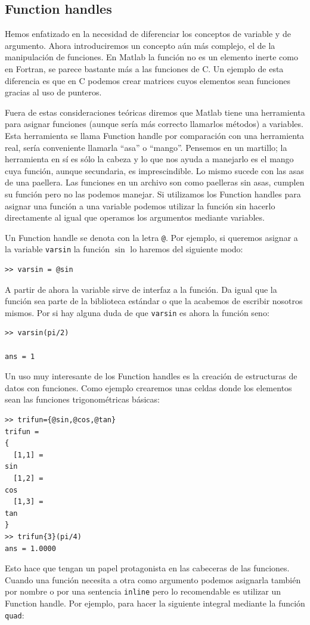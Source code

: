 \subsection{Function handles}

Hemos enfatizado en la necesidad de diferenciar los conceptos de
variable y de argumento. Ahora introduciremos un concepto aún más
complejo, el de la manipulación de funciones. En Matlab la función no
es un elemento inerte como en Fortran, se parece bastante más a las
funciones de C. Un ejemplo de esta diferencia es que en C podemos
crear matrices cuyos elementos sean funciones gracias al uso de
punteros.

Fuera de estas consideraciones teóricas diremos que Matlab tiene una
herramienta para asignar funciones (aunque sería más correcto
llamarlos métodos) a variables. Esta herramienta se llama Function
handle por comparación con una herramienta real, sería conveniente
llamarla {}``asa'' o {}``mango''. Pensemos en un martillo; la
herramienta en sí es sólo la cabeza y lo que nos ayuda a manejarlo es
el mango cuya función, aunque secundaria, es imprescindible. Lo mismo
sucede con las asas de una paellera. Las funciones en un archivo son
como paelleras sin asas, cumplen su función pero no las podemos
manejar. Si utilizamos los Function handles para asignar una función a
una variable podemos utilizar la función sin hacerlo directamente al
igual que operamos los argumentos mediante variables.

Un Function handle se denota con la letra \texttt{@}. Por ejemplo, si
queremos asignar a la variable \texttt{varsin} la función $\sin$ lo
haremos del siguiente modo:

\begin{lstlisting}
>> varsin = @sin
\end{lstlisting}
A partir de ahora la variable sirve de interfaz a la función. Da igual
que la función sea parte de la biblioteca estándar o que la acabemos
de escribir nosotros mismos. Por si hay alguna duda de que
\texttt{varsin} es ahora la función seno:

\begin{lstlisting}
>> varsin(pi/2)

ans = 1
\end{lstlisting}
Un uso muy interesante de los Function handles es la creación de
estructuras de datos con funciones. Como ejemplo crearemos unas celdas
donde los elementos sean las funciones trigonométricas básicas:

\begin{lstlisting}
>> trifun={@sin,@cos,@tan}
trifun =
{
  [1,1] =
sin
  [1,2] =
cos
  [1,3] =
tan
}
>> trifun{3}(pi/4)
ans = 1.0000
\end{lstlisting}
Esto hace que tengan un papel protagonista en las cabeceras de las
funciones. Cuando una función necesita a otra como argumento podemos
asignarla también por nombre o por una sentencia \texttt{inline} pero
lo recomendable es utilizar un Function handle. Por ejemplo, para
hacer la siguiente integral mediante la función \texttt{quad}:


